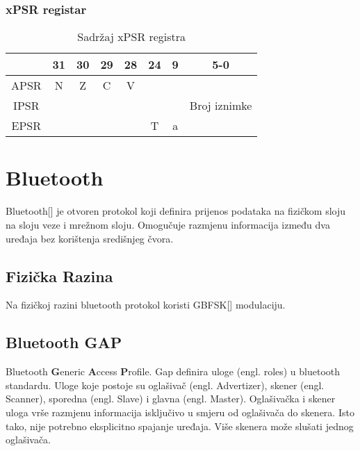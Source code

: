 \documentclass[times, utf8, diplomski]{diplomski}
\begin{document}
\subsubsection{xPSR registar}

\begin{table}[h]
  \begin{center}
    \begin{tabular}{c|c|c|c|c||c||c||c|}
      \cline{2-8} & 31 & 30 & 29 & 28 & 24 & 9 & 5-0\\
      \hline
      \multicolumn{1}{|c|}{APSR} & N & Z & C & V & \multicolumn{3}{c|}{ } \\
      \hline
      \multicolumn{1}{|c|}{IPSR} & \multicolumn{6}{c||}{ } & Broj iznimke \\
      \hline
      \multicolumn{1}{|c|}{EPSR} & \multicolumn{4}{c||}{ } & T & a & \\
      \hline
    \end{tabular}
    \caption{Sadržaj xPSR registra}
  \end{center}
\end{table}

\newpage

\section{Bluetooth}
Bluetooth[\cite{core41}] je otvoren protokol koji definira prijenos podataka na fizičkom sloju na sloju veze i mrežnom sloju. Omogučuje razmjenu informacija između dva uređaja bez korištenja središnjeg čvora.

\subsection {Fizička Razina}
Na fizičkoj razini bluetooth protokol koristi GBFSK[\cite{GBFSK}] modulaciju.

\subsection{Bluetooth GAP}
Bluetooth \textbf{G}eneric \textbf{A}ccess \textbf{P}rofile.
Gap definira uloge (engl. roles) u bluetooth standardu. Uloge koje postoje su oglašivač (engl. Advertizer), skener (engl. Scanner), sporedna (engl. Slave) i glavna (engl. Master). Oglašivačka i skener uloga vrše razmjenu informacija isključivo u smjeru od oglašivača do skenera. Isto tako, nije potrebno eksplicitno spajanje uređaja.
Više skenera može slušati jednog oglašivača.
\end{document}
